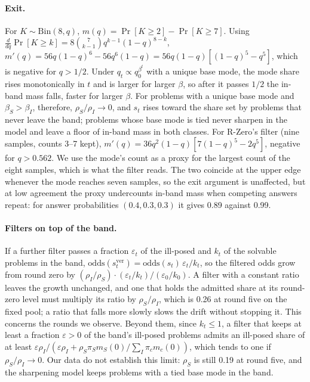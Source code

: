 \paragraph{Exit.} For $K \sim \mathrm{Bin}(8, q)$, $m(q) = \Pr[K \ge 2] - \Pr[K \ge 7]$. Using $\frac{d}{dq}\Pr[K \ge k] = 8\binom{7}{k-1} q^{k-1}(1-q)^{8-k}$, $m'(q) = 56 q (1-q)^6 - 56 q^6 (1-q) = 56 q(1-q)[(1-q)^5 - q^5]$, which is negative for $q > 1/2$. Under $q_t \propto q_0^{\beta^t}$ with a unique base mode, the mode share rises monotonically in $t$ and is larger for larger $\beta$, so after it passes $1/2$ the in-band mass falls, faster for larger $\beta$. For problems with a unique base mode and $\beta_S > \beta_I$, therefore, $\rho_S/\rho_I \to 0$, and $s_t$ rises toward the share set by problems that never leave the band; problems whose base mode is tied never sharpen in the model and leave a floor of in-band mass in both classes. For R-Zero's filter (nine samples, counts 3--7 kept), $m'(q) = 36 q^2 (1-q)[7(1-q)^5 - 2 q^5]$, negative for $q > 0.562$. We use the mode's count as a proxy for the largest count of the eight samples, which is what the filter reads. The two coincide at the upper edge whenever the mode reaches seven samples, so the exit argument is unaffected, but at low agreement the proxy undercounts in-band mass when competing answers repeat: for answer probabilities $(0.4, 0.3, 0.3)$ it gives 0.89 against 0.99.

\paragraph{Filters on top of the band.} If a further filter passes a fraction $\varepsilon_t$ of the ill-posed and $k_t$ of the solvable problems in the band, $\mathrm{odds}(s^{\mathrm{ver}}_t) = \mathrm{odds}(s_t)\, \varepsilon_t / k_t$, so the filtered odds grow from round zero by $(\rho_I/\rho_S) \cdot (\varepsilon_t/k_t) / (\varepsilon_0/k_0)$. A filter with a constant ratio leaves the growth unchanged, and one that holds the admitted share at its round-zero level must multiply its ratio by $\rho_S/\rho_I$, which is 0.26 at round five on the fixed pool; a ratio that falls more slowly slows the drift without stopping it. This concerns the rounds we observe. Beyond them, since $k_t \le 1$, a filter that keeps at least a fraction $\varepsilon > 0$ of the band's ill-posed problems admits an ill-posed share of at least $\varepsilon \rho_I / (\varepsilon \rho_I + \rho_S \pi_S m_S(0) / \sum_I \pi_c m_c(0))$, which tends to one if $\rho_S / \rho_I \to 0$. Our data do not establish this limit: $\rho_S$ is still 0.19 at round five, and the sharpening model keeps problems with a tied base mode in the band.

